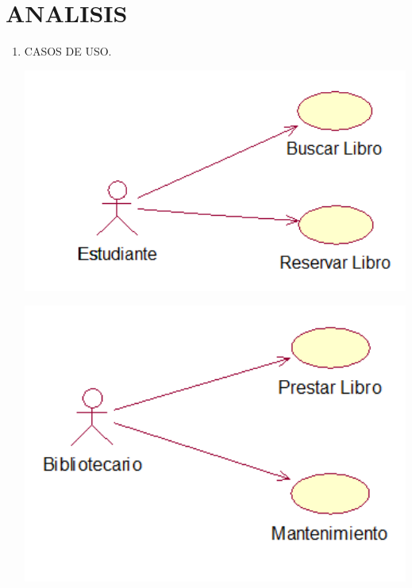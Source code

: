 \section{ANALISIS} 

\begin{enumerate}[1.]
	\item CASOS DE USO.\\
	
    


	\begin{center}
	\includegraphics[width=15cm]{./Imagenes/img1} 
	\end{center}
	
	\begin{center}
	\includegraphics[width=15cm]{./Imagenes/img2} 
	\end{center}

\end{enumerate} 
